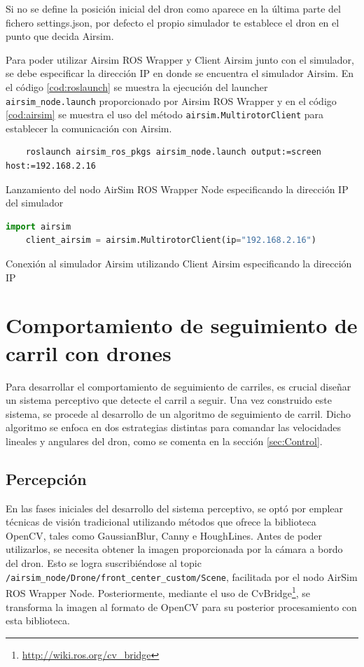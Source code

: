 Si no se define la posición inicial del dron como aparece en la última parte del fichero settings.json, por defecto el propio simulador te establece el dron en el punto que decida Airsim.

Para poder utilizar Airsim ROS Wrapper y Client Airsim junto con el simulador, se debe especificar la dirección IP en donde se encuentra el simulador Airsim. En el código 
\ref{cod:roslaunch} se muestra la ejecución del launcher \texttt{airsim\_node.launch} proporcionado por Airsim ROS Wrapper y en el código \ref{cod:airsim} se muestra el uso del método
\texttt{airsim.MultirotorClient}
para establecer la comunicación con Airsim.

\begin{code}  [H]
  \begin{lstlisting}
    roslaunch airsim_ros_pkgs airsim_node.launch output:=screen host:=192.168.2.16
  \end{lstlisting}
  \caption[comando]{Lanzamiento del nodo AirSim ROS Wrapper Node especificando la dirección IP del simulador}
  \label{cod:roslaunch}
\end{code} 

\begin{code}  [H]
  \begin{lstlisting}[language=Python]
    import airsim
    client_airsim = airsim.MultirotorClient(ip="192.168.2.16")
  \end{lstlisting}
  \caption[comando]{Conexión al simulador Airsim utilizando Client Airsim especificando la dirección IP}
  \label{cod:airsim}
\end{code} 



\section{Comportamiento de seguimiento de carril con drones}
\label{sec:Comportamiento de seguimiento de carril con drones}
Para desarrollar el comportamiento de seguimiento de carriles, es crucial diseñar un sistema perceptivo que detecte el carril a seguir. Una vez 
construido este sistema, se procede al desarrollo de un algoritmo de seguimiento de carril. Dicho algoritmo se enfoca en dos estrategias distintas 
para comandar las velocidades lineales y angulares del dron, como se comenta en la sección \ref{sec:Control}. 
\subsection{Percepción}
\label{sec:Percepción}
En las fases iniciales del desarrollo del sistema perceptivo, se optó por emplear técnicas de visión tradicional utilizando métodos que ofrece la biblioteca 
OpenCV, tales como GaussianBlur, Canny e HoughLines. Antes de poder utilizarlos, se necesita obtener la imagen proporcionada por la cámara a bordo del dron. Esto se logra
suscribiéndose al topic \texttt{/airsim\_node/Drone/front\_center\_custom/Scene}, facilitada por el nodo AirSim ROS Wrapper Node. Posteriormente, mediante el uso de 
CvBridge\footnote{\url{http://wiki.ros.org/cv_bridge}}, se transforma la imagen al formato de OpenCV para su posterior procesamiento con esta biblioteca.

